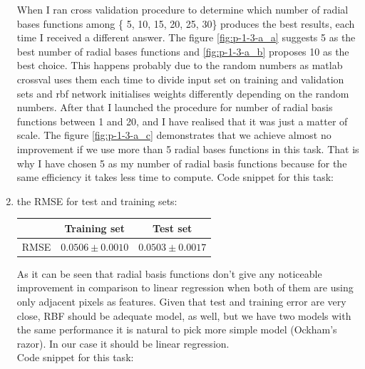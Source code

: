 \documentclass{article}
\begin{document}
\begin{enumerate}[label=(\alph*)]
\begin{figure}[t]
				 	\end{figure}	
				 	When I ran cross validation procedure to determine which number of radial bases functions among \{ 5, 10, 15, 20, 25, 30\} produces the best results, each time I received a different answer.  The figure \ref{fig:p-1-3-a_a} suggests 5 as the best number of radial bases functions and \ref{fig:p-1-3-a_b} proposes 10 as the best choice. This happens probably due to the random numbers as matlab crossval uses them each time to divide input set on training and validation sets and rbf network initialises weights differently depending on the random numbers. After that I launched the procedure for number of radial basis functions between 1 and 20, and I have realised that it was just a matter of scale. The figure \ref{fig:p-1-3-a_c} demonstrates that we achieve almost no improvement if we use more than 5 radial bases functions in this task. That is why I have chosen 5 as my number of radial basis functions because for the same efficiency it takes less time to compute.
				 	Code snippet for this task:
				 	
				 \item
					the RMSE for test and training sets:
					\begin{center}
						\begin{tabular}{| c | c | c |}
							\hline
							\, & Training set & Test set \\ \hline
							RMSE  & $0.0506 \pm 0.0010$ & $0.0503 \pm 0.0017$ \\ 
							\hline
						\end{tabular}
					\end{center}
					As it can be seen that radial basis functions don't give any noticeable improvement in comparison to linear regression when both of them are using only adjacent pixels as features. Given that test and training error are very close, RBF should be adequate model, as well, but we have two models with the same performance it is natural to pick more simple model (Ockham's razor). In our case it should be linear regression. \\
				 	Code snippet for this task:
				 	
			\end{enumerate}
			 
\end{document}
